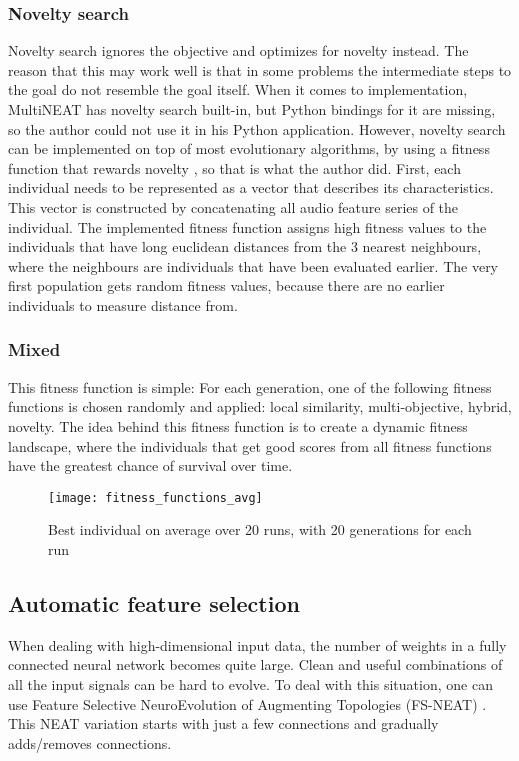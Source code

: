\subsubsection{Novelty search}
Novelty search \citep{lehman2008} ignores the objective and optimizes for novelty instead. The reason that this may work well is that in some problems the intermediate steps to the goal do not resemble the goal itself. When it comes to implementation, MultiNEAT has novelty search built-in, but Python bindings for it are missing, so the author could not use it in his Python application. However, novelty search can be implemented on top of most evolutionary algorithms, by using a fitness function that rewards novelty \citep{noveltysearchwebsite}, so that is what the author did. First, each individual needs to be represented as a vector that describes its characteristics. This vector is constructed by concatenating all audio feature series of the individual. The implemented fitness function assigns high fitness values to the individuals that have long euclidean distances from the 3 nearest neighbours, where the neighbours are individuals that have been evaluated earlier. The very first population gets random fitness values, because there are no earlier individuals to measure distance from.

\subsubsection{Mixed}
This fitness function is simple: For each generation, one of the following fitness functions is chosen randomly and applied: local similarity, multi-objective, hybrid, novelty. The idea behind this fitness function is to create a dynamic fitness landscape, where the individuals that get good scores from all fitness functions have the greatest chance of survival over time.

\begin{figure}[H]
    \centering
    \texttt{[image: fitness\_functions\_avg]}
    \caption{Best individual on average over 20 runs, with 20 generations for each run}
    \label{fig:fitness_functions_avg}
\end{figure}

\subsection{Automatic feature selection}
When dealing with high-dimensional input data, the number of weights in a fully connected neural network becomes quite large. Clean and useful combinations of all the input signals can be hard to evolve. To deal with this situation, one can use Feature Selective NeuroEvolution of Augmenting Topologies (FS-NEAT) \citep{whiteson2005}. This NEAT variation starts with just a few connections and gradually adds/removes connections.

